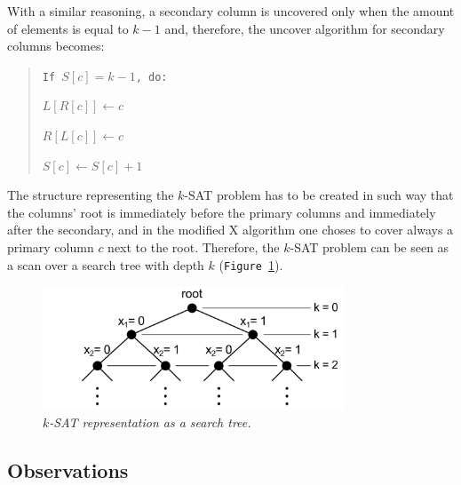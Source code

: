 \documentclass[12pt]{article}
\begin{document}
\linespread{1.5}

With a similar reasoning, a secondary column is uncovered only when the amount of elements is equal to $k - 1$ and, therefore, the uncover algorithm for secondary columns becomes:
\\[-10pt]

\linespread{0.8}

{\small
  \begin{quote}
    \texttt{If $S{\left[ c \right]} = k - 1$, do:}

       \hspace{0.5cm}\texttt{$L{\left[ R{\left[ c \right]} \right]} \leftarrow c$}

       \hspace{0.5cm}\texttt{$R{\left[ L{\left[ c \right]} \right]} \leftarrow c$}

    \texttt{$S{\left[ c \right]} \leftarrow S{\left[ c \right]} + 1$}
  \end{quote}
}

\linespread{1.5}

The structure representing the $k$-SAT problem has to be created in such way that the columns' root is immediately before the primary columns and immediately after the secondary, and in the modified X algorithm one choses to cover always a primary column $c$ next to the root.
Therefore, the $k$-SAT problem can be seen as a scan over a search tree with depth $k$ (\texttt{Figure \ref{fig:arvore}}).

\begin{figure}[htbp]
  \begin{center}
    \includegraphics[width=9cm]{images/tree.pdf}
    \caption{\small{\emph{$k$-SAT representation as a search tree.}}}
    \label{fig:arvore}
  \end{center}
\end{figure}


\subsection{Observations}
\end{document}
